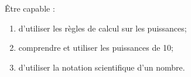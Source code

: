 \begin{myobj}
	Être capable : 
\begin{enumerate}
	\item d'utiliser les règles de calcul sur les puissances;
	\item comprendre et utiliser les puissances de 10;
	\item d'utiliser la notation scientifique d'un nombre.  
\end{enumerate}
\end{myobj}